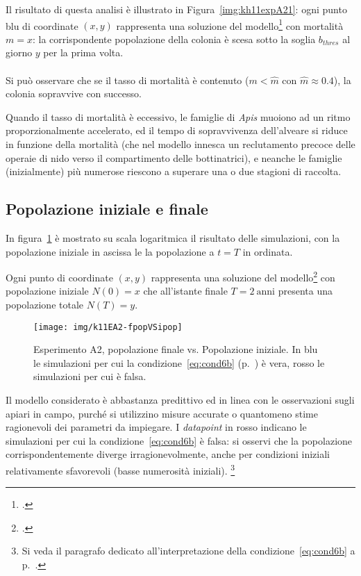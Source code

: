 Il risultato di questa analisi è illustrato in Figura~\ref{img:kh11expA21}: ogni punto blu di coordinate $(x,y)$
rappresenta una soluzione del modello\footcite{khoury2011} con mortalità $m=x$: la corrispondente popolazione
della colonia è scesa sotto la soglia $b_{thres}$ al giorno $y$ per la prima volta.

\paragraph{}
Si può osservare che se il tasso di mortalità è contenuto ($m< \hat{m}$ con $\hat{m} \approx 0.4$),
la colonia sopravvive con successo.

Quando il tasso di mortalità è eccessivo, le famiglie di \emph{Apis} muoiono ad un ritmo proporzionalmente accelerato, ed
il tempo di sopravvivenza dell'alveare si riduce in funzione della mortalità (che nel modello innesca un reclutamento
precoce delle operaie di nido verso il compartimento delle bottinatrici), e neanche le famiglie (inizialmente) più numerose
riescono a superare una o due stagioni di raccolta.


\subsection{Popolazione iniziale e finale}
In figura~\ref{img:kh11expA22} è mostrato su scala logaritmica il risultato delle simulazioni, con la popolazione
iniziale in ascissa le la popolazione a $t=T$ in ordinata.

Ogni punto di coordinate $(x,y)$ rappresenta una soluzione del modello\footcite{khoury2011} con popolazione iniziale
$N(0) = x$ che all'istante finale $T=2~\text{anni}$ presenta una popolazione totale $N(T) = y$.

\begin{figure}[hbt]
    \centering
    \texttt{[image: img/k11EA2-fpopVSipop]}

    \caption[Esperimento A2, popolazione finale vs. Popolazione iniziale.]{Esperimento A2, popolazione finale vs.
    Popolazione iniziale. In blu le simulazioni per cui la condizione~\eqref{eq:cond6b} (p.~\pageref{eq:cond6b}) è vera,
    rosso le simulazioni per cui è falsa.}

    \label{img:kh11expA22}
\end{figure}

Il modello considerato è abbastanza predittivo ed in linea con le osservazioni sugli apiari in campo, purché si
utilizzino misure accurate o quantomeno stime ragionevoli dei parametri da impiegare.
I \emph{datapoint} in rosso indicano le simulazioni per cui la condizione~\eqref{eq:cond6b} è falsa: si
osservi che la popolazione corrispondentemente diverge irragionevolmente, anche per condizioni iniziali
relativamente sfavorevoli (\ie basse numerosità iniziali).
\footnote{Si veda il paragrafo dedicato all'interpretazione della condizione~\eqref{eq:cond6b}
a p.~\pageref{par:interpretationCond6b}.}

